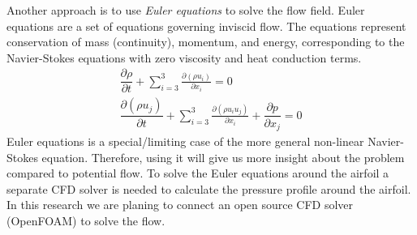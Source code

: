 \documentclass[paper=a4, fontsize=12pt]{scrartcl} %
\begin{document}
Another approach is to use \emph{Euler equations} to solve the flow field. Euler equations are a set of equations governing inviscid flow. The equations represent conservation of mass (continuity), momentum, and energy, corresponding to the Navier-Stokes equations with zero viscosity and heat conduction terms.
%
\begin{subequations}
\begin{gather}
	\dfrac{\partial \rho}{\partial t} + 
		\sum_{i=3}^3 \frac{\partial \left( \rho u_i \right)}{\partial x_i} = 0
	\\
	\dfrac{\partial \left( \rho u_j \right)}{\partial t} + 
		\sum_{i=3}^3 \frac{\partial \left( \rho u_i u_j \right)}{\partial x_i} + 
		\dfrac{\partial p}{\partial x_j} = 0
\end{gather}
\end{subequations}
%
Euler equations is a special/limiting case of the more general {non-linear} Navier-Stokes equation. Therefore, using it will give us more insight about the problem compared to potential flow. To solve the Euler equations around the airfoil a separate CFD solver is needed to calculate the pressure profile around the airfoil. In this research we are planing to connect an open source CFD solver (OpenFOAM) to solve the flow.
\end{document}
